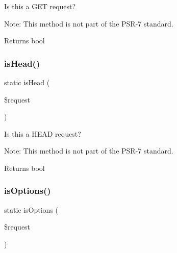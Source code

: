 Is this a G\+ET request?

Note\+: This method is not part of the P\+S\+R-\/7 standard.

\begin{DoxyReturn}{Returns}
bool 
\end{DoxyReturn}
\mbox{\label{class_pes_1_1_http_1_1_helper_1_1_request_status_a95d8c0e60e1c9c015701106b27aa3ae1}} 
\subsubsection{\texorpdfstring{is\+Head()}{isHead()}}
{\footnotesize\ttfamily static is\+Head (\begin{DoxyParamCaption}\item[{Server\+Request\+Interface}]{\$request }\end{DoxyParamCaption})\hspace{0.3cm}{\ttfamily [static]}}

Is this a H\+E\+AD request?

Note\+: This method is not part of the P\+S\+R-\/7 standard.

\begin{DoxyReturn}{Returns}
bool 
\end{DoxyReturn}
\mbox{\label{class_pes_1_1_http_1_1_helper_1_1_request_status_afd0ca684b3dc9c853913bad719ffb8f8}} 
\subsubsection{\texorpdfstring{is\+Options()}{isOptions()}}
{\footnotesize\ttfamily static is\+Options (\begin{DoxyParamCaption}\item[{Server\+Request\+Interface}]{\$request }\end{DoxyParamCaption})\hspace{0.3cm}{\ttfamily [static]}}

